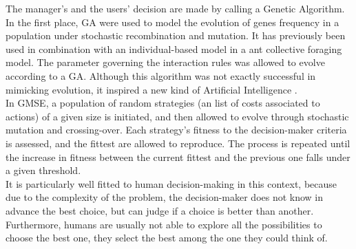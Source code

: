 \documentclass[12pt,a4paper]{article}
\begin{document}
The manager's and the users' decision are made by calling a Genetic Algorithm.
In the first place, GA were used to model the evolution of genes frequency in a population under stochastic recombination and mutation.
It has previously been used in combination with an individual-based model in a ant collective foraging model.
The parameter governing the interaction rules was allowed to evolve according to a GA.
Although this algorithm was not exactly successful in mimicking evolution, it inspired a new kind of Artificial Intelligence \citep{hamblin2013practical}.\\
In GMSE, a population of random strategies (an list of costs associated to actions) of a given size is initiated, and then allowed to evolve through stochastic mutation and crossing-over.
Each strategy's fitness to the decision-maker criteria is assessed, and the fittest are allowed to reproduce.
The process is repeated until the increase in fitness between the current fittest and the previous one falls under a given threshold.\\
It is particularly well fitted to human decision-making in this context, because due to the complexity of the problem, the decision-maker does not know in advance the best choice, but can judge if a choice is better than another.
Furthermore, humans are usually not able to explore all the possibilities to choose the best one, they select the best among the one they could think of.
%
%
\end{document}
